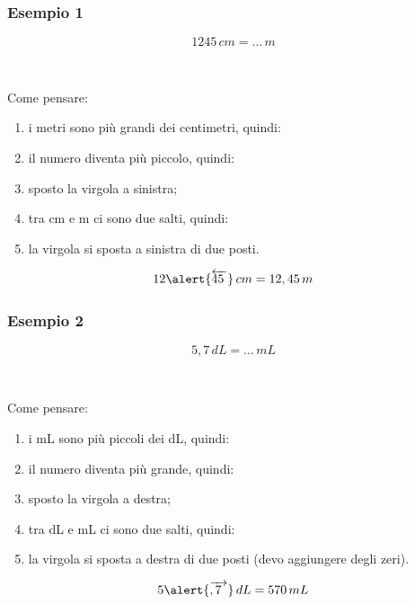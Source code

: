 \documentclass[handout]{beamer}
\theoremstyle{plain}
\begin{document}
\begin{frame}
\frametitle{Esempio 1}
\[  1245 \, cm = \ldots \, m \]\pause

~

Come pensare:
\begin{enumerate}
  \item i metri sono più grandi dei centimetri, quindi:
  \item il numero diventa più piccolo, quindi:
  \item sposto la virgola a sinistra;
  \item tra cm e m ci sono due salti, quindi:
  \item la virgola si sposta a sinistra di due posti.
\end{enumerate}
  
\[  12\alert{\overleftarrow{45\phantom{,}}} \, cm = 12,45 \, m \]\pause
\end{frame}


\begin{frame}
\frametitle{Esempio 2}
\[  5,7 \, dL = \ldots \, mL \]\pause

~

Come pensare:
\begin{enumerate}
  \item i mL sono più piccoli dei dL, quindi:
  \item il numero diventa più grande, quindi:
  \item sposto la virgola a destra;
  \item tra dL e mL ci sono due salti, quindi:
  \item la virgola si sposta a destra di due posti (devo aggiungere degli zeri).
\end{enumerate}
  
\[  5\alert{\overrightarrow{,7\phantom{0}}} \, dL = 570 \, mL \]\pause
\end{frame}
\end{document}
